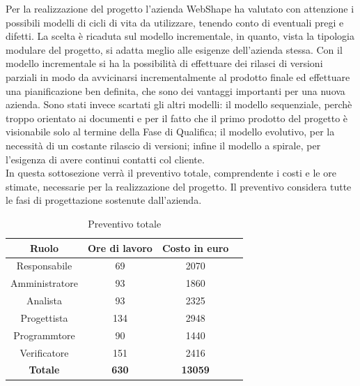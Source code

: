 Per la realizzazione del progetto l'azienda WebShape ha valutato con attenzione i possibili modelli di cicli di vita da utilizzare, tenendo conto di eventuali pregi e difetti. 
La scelta \`e ricaduta sul modello incrementale, in quanto, vista la tipologia modulare del progetto, si adatta meglio alle esigenze dell'azienda stessa. Con il modello incrementale si ha la possibilit\`a di effettuare dei rilasci di versioni parziali in modo da avvicinarsi incrementalmente al prodotto finale ed effettuare una pianificazione ben definita, che sono dei vantaggi importanti per una nuova azienda. Sono stati invece scartati gli altri modelli: il modello sequenziale, perch\`e troppo orientato ai documenti e per il fatto che il primo prodotto del progetto \` e visionabile solo al termine della Fase di Qualifica; il modello evolutivo, per la necessit\`a di un costante rilascio di versioni; infine il modello a spirale, per l'esigenza di avere continui contatti col cliente.\\
In questa sottosezione verr\` a il preventivo totale, comprendente i costi e le ore stimate, necessarie per la realizzazione del progetto. Il preventivo considera tutte le fasi di progettazione sostenute dall'azienda.

\begin{table}[h]
	\begin{center}
		  \begin{tabular}{|c|c|c|c|}
		 \hline 
		 \textbf{Ruolo} & \textbf{Ore di lavoro} & \textbf{Costo in euro}\\
		 \hline
		Responsabile & 69 & 2070 \\
		Amministratore & 93 & 1860\\
		Analista & 93 & 2325\\
		Progettista & 134 & 2948\\
		Programmtore & 90 & 1440 \\
		Verificatore & 151 & 2416\\
        \hline
        \textbf{Totale} & \textbf{630} & \textbf{13059}\\
		\hline
		\end{tabular}
	\caption{Preventivo totale} 
	\label{tab:tabella_preventivo}
	\end{center}	
\end{table}


